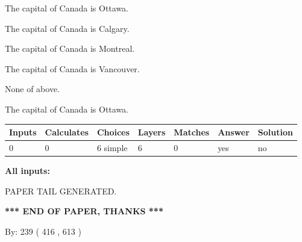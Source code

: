 \documentclass[12pt]{article}
\begin{document}
 
The capital of Canada is Ottawa.
 
 
The capital of Canada is Calgary.
 
 
The capital of Canada is Montreal.
 
 
The capital of Canada is Vancouver.
 
 
 None of above.
 
 
\noindent{}
 
 
The capital of Canada is Ottawa.
 
 
\noindent{}
 
 
   
   
   
   
\noindent\begin{tabular}{|l|l|l|l|l|l|l|}
 \hline
Inputs & Calculates & Choices & Layers & Matches & Answer & Solution \\ \hline
 0  & 
 0  & 
 6
  simple  
  & 
 6  & 
 0  & 
  yes & 
  no 
  \\ \hline
 \end{tabular}
   
   
   
   
\noindent{}
   
   
   
   
\noindent\vspace{0.1in}\hspace{-0.08in} {\textbf{\Large{All inputs: }}}
   
   
   
   
   
   
 \vspace{0.2in}
 
   
   
\vspace{2.0in} PAPER TAIL GENERATED.
   
   
   
   
\vspace{1.0in} 
{\textbf{\large{ *** END OF PAPER, THANKS *** }}} 
   
   
\hspace{1.0in} By: 
 239 ( 416 ,  613 )
   
\end{document}
